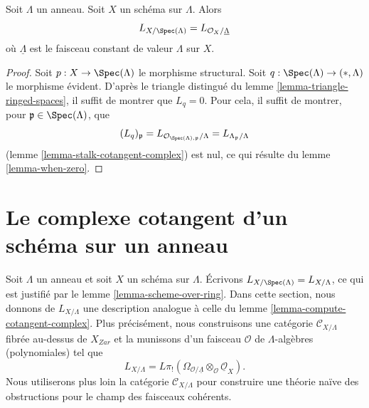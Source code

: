 \begin{lemma}
\label{lemma-scheme-over-ring}
Soit $\Lambda$ un anneau. Soit $X$ un schéma sur $\Lambda$. Alors
$$
L_{X/\Spec(\Lambda)} = L_{\mathcal{O}_X/\underline{\Lambda}}
$$
où $\underline{\Lambda}$ est le faisceau constant de valeur $\Lambda$ sur $X$.
\end{lemma}

\begin{proof}
Soit $p : X \to \Spec(\Lambda)$ le morphisme structural. Soit
$q : \Spec(\Lambda) \to (*, \Lambda)$ le morphisme évident. D'après le triangle
distingué du lemme \ref{lemma-triangle-ringed-spaces}, il suffit de montrer que
$L_q = 0$. Pour cela, il suffit de montrer, pour
$\mathfrak p \in \Spec(\Lambda)$, que
$$
(L_q)_\mathfrak p =
L_{\mathcal{O}_{\Spec(\Lambda), \mathfrak p}/\Lambda} =
L_{\Lambda_\mathfrak p/\Lambda}
$$
(lemme \ref{lemma-stalk-cotangent-complex}) est nul, ce qui résulte du lemme
\ref{lemma-when-zero}.
\end{proof}






\section{Le complexe cotangent d'un schéma sur un anneau}
\label{section-cotangent-schemes-variant}

\noindent
Soit $\Lambda$ un anneau et soit $X$ un schéma sur $\Lambda$. Écrivons
$L_{X/\Spec(\Lambda)} = L_{X/\Lambda}$, ce qui est justifié par le lemme
\ref{lemma-scheme-over-ring}. Dans cette section, nous donnons de
$L_{X/\Lambda}$ une description analogue à celle du lemme
\ref{lemma-compute-cotangent-complex}. Plus précisément, nous construisons une
catégorie $\mathcal{C}_{X/\Lambda}$ fibrée au-dessus de $X_{Zar}$ et la
munissons d'un faisceau $\mathcal{O}$ de $\Lambda$-algèbres (polynomiales) tel
que
$$
L_{X/\Lambda} =
L\pi_!(\Omega_{\mathcal{O}/\underline{\Lambda}} \otimes_\mathcal{O}
\underline{\mathcal{O}}_X).
$$
Nous utiliserons plus loin la catégorie $\mathcal{C}_{X/\Lambda}$ pour
construire une théorie naïve des obstructions pour le champ des faisceaux
cohérents.

